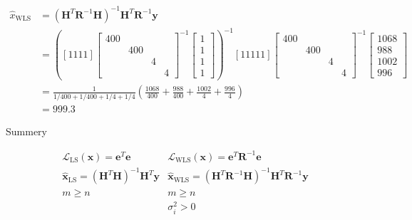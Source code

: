 \documentclass{article}
\begin{document}
\begin{equation}
\begin{aligned} \hat{x}_{\mathrm{WLS}} &=\left(\mathbf{H}^{T} \mathbf{R}^{-1} \mathbf{H}\right)^{-1} \mathbf{H}^{T} \mathbf{R}^{-1} \mathbf{y} \\ &=\left([1111]\left[\begin{array}{cccc}{400} & {}  & {}  & {} \\ 
                         {} & {400}  & {}   & {}  \\ 
                         {} & {} & {4} & {}  \\ 
                         {} & {} & {} & {4}
\end{array}\right]^{-1}
\left[\begin{array}{l}{1} \\ {1} \\ {1} \\ {1}\end{array}\right]
\right)^{-1}[11111]\left[\begin{array}{cccc}{400} & {}  & {}  & {} \\ 
                         {} & {400}  & {}   & {}  \\ 
                         {} & {} & {4} & {}  \\ 
                         {} & {} & {} & {4}
\end{array}\right]^{-1}\left[\begin{array}{c}{1068} \\ {988} \\ {1002} \\ {996}\end{array}\right] \\
 &= \frac{1}{1 / 400+1 / 400+1 / 4+1 / 4}\left(\frac{1068}{400}+\frac{988}{400}+\frac{1002}{4}+\frac{996}{4}\right) \\
 &= 999.3\end{aligned}
\end{equation}


Summery 

\begin{equation}
\begin{array}{cc}
{\mathscr{L}_{\mathrm{LS}}(\mathbf{x})=\mathbf{e}^{T} \mathbf{e}} & 
{\mathscr{L}_{\mathrm{WLS}}(\mathbf{x})=\mathbf{e}^{T} \mathbf{R}^{-1} \mathbf{e}} \\
 {\hat{\mathbf{x}}_{\mathrm{LS}}=\left(\mathbf{H}^{T} \mathbf{H}\right)^{-1} \mathbf{H}^{T} \mathbf{y}} 
& {\hat{\mathbf{x}}_{\mathrm{WLS}}=\left(\mathbf{H}^{T} \mathbf{R}^{-1} \mathbf{H}\right)^{-1} \mathbf{H}^{T} 
\mathbf{R}^{-1} \mathbf{y}} \\ {m \geq n} & {m \geq n} \\ {} & {\sigma_{i}^{2}>0}
\end{array}
\end{equation}
\end{document}
